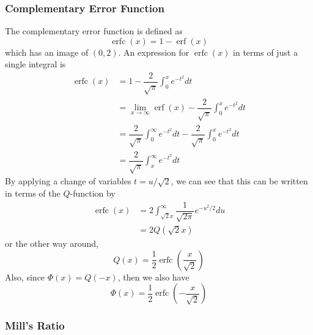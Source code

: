 \documentclass[11pt]{report} %
\begin{document}
\subsubsection{Complementary Error Function}

The complementary error function is defined as
\begin{equation}
\operatorname{erfc}\left(x\right) = 1 - \operatorname{erf}\left(x\right)
\end{equation}
which has an image of $\left(0, 2\right)$. An expression for $\operatorname{erfc}\left(x\right)$ in terms of just a single integral is
\begin{align}
\operatorname{erfc}\left(x\right) &= 1-\dfrac{2}{\sqrt{\pi}}\int_{0}^{x}e^{-t^{2}}dt \\
&= \lim_{x\to\infty}\operatorname{erf}\left(x\right)-\dfrac{2}{\sqrt{\pi}}\int_{0}^{x}e^{-t^{2}}dt \\
&= \dfrac{2}{\sqrt{\pi}}\int_{0}^{\infty}e^{-t^{2}}dt-\dfrac{2}{\sqrt{\pi}}\int_{0}^{x}e^{-t^{2}}dt \\
&= \dfrac{2}{\sqrt{\pi}}\int_{x}^{\infty}e^{-t^{2}}dt
\end{align}
By applying a change of variables $t = u/\sqrt{2}$, we can see that this can be written in terms of the $Q$-function by
\begin{align}
\operatorname{erfc}\left(x\right) &= 2\int_{\sqrt{2}x}^{\infty}\dfrac{1}{\sqrt{2\pi}}e^{-u^{2}/2}du \\
&= 2Q\left(\sqrt{2}x\right)
\end{align}
or the other way around,
\begin{equation}
Q\left(x\right) = \dfrac{1}{2}\operatorname{erfc}\left(\dfrac{x}{\sqrt{2}}\right)
\end{equation}
Also, since $\Phi\left(x\right) = Q\left(-x\right)$, then we also have
\begin{equation}
\Phi\left(x\right) = \dfrac{1}{2}\operatorname{erfc}\left(-\dfrac{x}{\sqrt{2}}\right)
\end{equation}


\subsubsection{Mill's Ratio}
\end{document}
